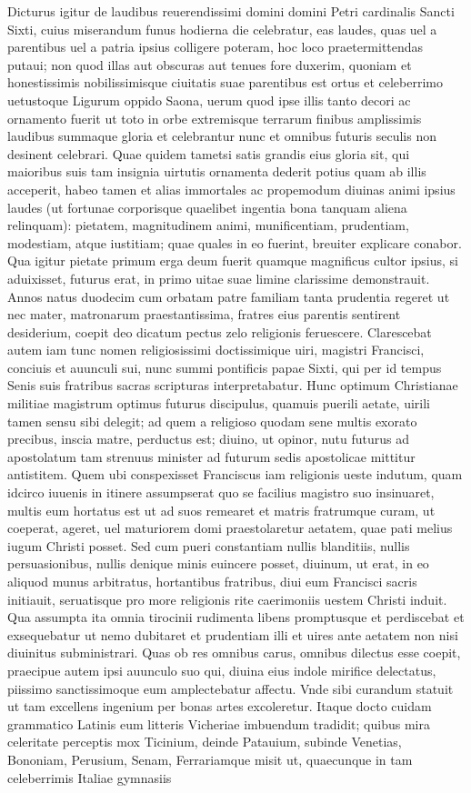 \documentclass[a5paper,twoside]{article}
\begin{document}
Dicturus igitur de laudibus reuerendissimi domini domini Petri cardinalis Sancti Sixti, cuius miserandum funus hodierna die celebratur, eas laudes, quas uel a parentibus uel a patria ipsius colligere poteram, hoc loco praetermittendas putaui; non quod illas aut obscuras aut tenues fore duxerim, quoniam et honestissimis nobilissimisque ciuitatis suae parentibus est ortus et celeberrimo uetustoque Ligurum oppido Saona, uerum quod ipse illis tanto decori ac ornamento fuerit ut toto in orbe extremisque terrarum finibus amplissimis laudibus summaque gloria et celebrantur nunc et omnibus futuris seculis non desinent celebrari. Quae quidem tametsi satis grandis eius gloria sit, qui maioribus suis tam insignia uirtutis ornamenta dederit potius quam ab illis acceperit, habeo tamen et alias immortales ac propemodum diuinas animi ipsius laudes (ut fortunae corporisque quaelibet ingentia bona tanquam aliena relinquam): pietatem, magnitudinem animi, munificentiam, prudentiam, modestiam, atque iustitiam; quae quales in eo fuerint, breuiter explicare conabor. Qua igitur pietate primum erga deum fuerit quamque magnificus cultor ipsius, si aduixisset, futurus erat, in primo uitae suae limine clarissime demonstrauit. Annos natus duodecim cum orbatam patre familiam tanta prudentia regeret ut nec mater, matronarum praestantissima, fratres eius parentis sentirent desiderium, coepit deo dicatum pectus zelo religionis feruescere. Clarescebat autem iam tunc nomen religiosissimi doctissimique uiri, magistri Francisci, conciuis et auunculi sui, nunc summi pontificis papae Sixti, qui per id tempus Senis suis fratribus sacras scripturas interpretabatur. Hunc optimum Christianae militiae magistrum optimus futurus discipulus, quamuis puerili aetate, uirili tamen sensu sibi delegit; ad quem a religioso quodam sene multis exorato precibus, inscia matre, perductus est; diuino, ut opinor, nutu futurus ad apostolatum tam strenuus minister ad futurum sedis apostolicae mittitur antistitem. Quem ubi conspexisset Franciscus iam religionis ueste indutum, quam idcirco iuuenis in itinere assumpserat quo se facilius magistro suo insinuaret, multis eum hortatus est ut ad suos remearet et matris fratrumque curam, ut coeperat, ageret, uel maturiorem domi praestolaretur aetatem, quae pati melius iugum Christi posset. Sed cum pueri constantiam nullis blanditiis, nullis persuasionibus, nullis denique minis euincere posset, diuinum, ut erat, in eo aliquod munus arbitratus, hortantibus fratribus, diui eum Francisci sacris initiauit, seruatisque pro more religionis rite caerimoniis uestem Christi induit. Qua assumpta ita omnia tirocinii rudimenta libens promptusque et perdiscebat et exsequebatur ut nemo dubitaret et prudentiam illi et uires ante aetatem non nisi diuinitus subministrari. Quas ob res omnibus carus, omnibus dilectus esse coepit, praecipue autem ipsi auunculo suo qui, diuina eius indole mirifice delectatus, piissimo sanctissimoque eum amplectebatur affectu. Vnde sibi curandum statuit ut tam excellens ingenium per bonas artes excoleretur. Itaque docto cuidam grammatico Latinis eum litteris Vicheriae imbuendum tradidit; quibus mira celeritate perceptis mox Ticinium, deinde Patauium, subinde Venetias, Bononiam, Perusium, Senam, Ferrariamque misit ut, quaecunque in tam celeberrimis Italiae gymnasiis 
\end{document}
